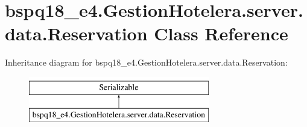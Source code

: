 \hypertarget{classbspq18__e4_1_1_gestion_hotelera_1_1server_1_1data_1_1_reservation}{}\section{bspq18\+\_\+e4.\+Gestion\+Hotelera.\+server.\+data.\+Reservation Class Reference}
\label{classbspq18__e4_1_1_gestion_hotelera_1_1server_1_1data_1_1_reservation}
Inheritance diagram for bspq18\+\_\+e4.\+Gestion\+Hotelera.\+server.\+data.\+Reservation\+:\begin{figure}[H]
\begin{center}
\leavevmode
\includegraphics[height=2.000000cm]{classbspq18__e4_1_1_gestion_hotelera_1_1server_1_1data_1_1_reservation}
\end{center}
\end{figure}
